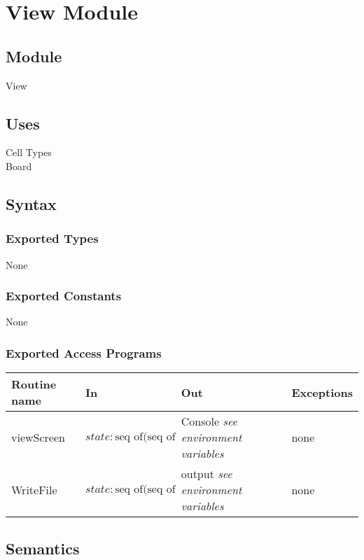 \documentclass[12pt]{article}
\begin{document}
\section* {View Module}

\subsection* {Module}

View

\subsection* {Uses}
Cell Types\\
Board

\subsection* {Syntax}

\subsubsection* {Exported Types}

None

\subsubsection* {Exported Constants}

None

\subsubsection* {Exported Access Programs}

\begin{tabular}{| l | l | l | p{3cm} |}
\hline
\textbf{Routine name} & \textbf{In} & \textbf{Out} & \textbf{Exceptions}\\
\hline
viewScreen & $state: \mbox{seq of(seq of CellT)}$ & Console \textit{see environment variables}& none\\
\hline
WriteFile & $state: \mbox{seq of(seq of CellT)}$ & output \textit{see environment variables} & none\\
\hline
\end{tabular}

\subsection* {Semantics}
\end{document}
